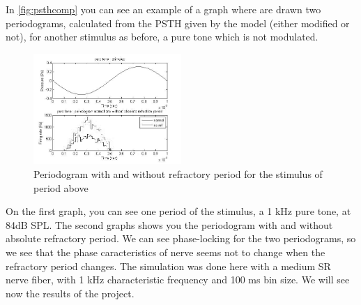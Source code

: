 In \autoref{fig:psthcomp} you can see an example of a graph
where are drawn two periodograms, calculated from the PSTH given by the model 
(either modified or not), for another stimulus as before, a pure tone
which is not modulated.


\begin{figure}[h]
	\centering
	\includegraphics[width=0.5\textwidth]{images/stim-psth-puretone-bw2.jpg}
	\caption{Periodogram with and without refractory period for the stimulus of period above}
	\label{fig:psthcomp}
\end{figure} 

On the first graph, you can see one period of the stimulus, 
a 1 kHz pure tone, at 84dB SPL.
The second graphs shows you the periodogram with and without absolute refractory period.
We can see phase-locking for the two periodograms, so we see that the phase caracteristics 
of nerve seems not to change when the refractory period changes.
The simulation was done here with a medium SR nerve fiber, 
with 1 kHz characteristic frequency and 100 ms bin size.
We will see now the results of the project.



 





